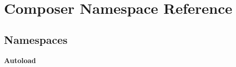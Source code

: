 \section{Composer Namespace Reference}
\label{namespace_composer}
\subsection*{Namespaces}
\begin{DoxyCompactItemize}
\item 
 {\bf Autoload}
\end{DoxyCompactItemize}
